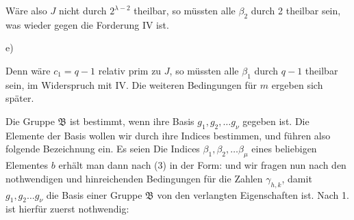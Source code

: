 Wäre also $J$ nicht durch $2^{\lambda-2}$ theilbar, so müssten alle $\beta_2$ durch 2 theilbar sein, was wieder gegen die Forderung IV ist.

e) 

Denn wäre $c_1=q-1$ relativ prim zu $J$, so müssten alle $\beta_1$ durch $q-1$ theilbar sein, im Widerspruch mit IV. Die weiteren Bedingungen für $m$ ergeben sich später.


Die Gruppe $\mathfrak{B}$ ist bestimmt, wenn ihre Basis $g_1, g_2, \dots g_\nu$ gegeben ist. Die Elemente der Basis wollen wir durch ihre Indices bestimmen, und führen also folgende Bezeichnung ein. Es seien
Die Indices $\beta_1, \beta_2, \dots \beta_\mu$ eines beliebigen Elementes $b$ erhält man dann nach (3) in der Form:
und wir fragen nun nach den nothwendigen und hinreichenden Bedingungen für die Zahlen $\gamma_{h,k}$, damit $g_1, g_2 \dots g_\nu$ die Basis einer Gruppe $\mathfrak{B}$ von den verlangten Eigenschaften ist. Nach 1. ist hierfür zuerst nothwendig:

